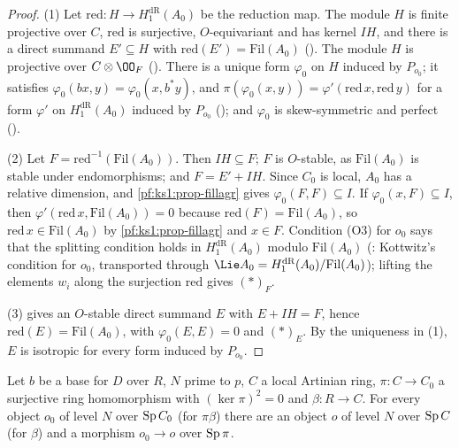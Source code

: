 \begin{proof}
(1) Let $\mathrm{red}:H\to H^{\mathrm{dR}}_1(A_0)$ be the reduction map. The module $H$ is finite projective over $C$, $\mathrm{red}$ is surjective,
$O$-equivariant and has kernel $IH$, and there is a direct summand $E'\subseteq H$ with $\mathrm{red}(E')=\mathrm{Fil}(A_0)$
(). The module $H$ is projective over $C\otimes\OO_F$
(). There is a unique form $\varphi_0$ on $H$ induced by $P_{o_0}$; it
satisfies $\varphi_0(bx,y)=\varphi_0(x,b^*y)$, and $\pi(\varphi_0(x,y))=\varphi'(\mathrm{red}\,x,\mathrm{red}\,y)$ for a form $\varphi'$ on
$H^{\mathrm{dR}}_1(A_0)$ induced by $P_{o_0}$ (); and $\varphi_0$ is skew-symmetric and perfect
().

(2) Let $F=\mathrm{red}^{-1}(\mathrm{Fil}(A_0))$. Then $IH\subseteq F$; $F$ is $O$-stable, as $\mathrm{Fil}(A_0)$ is stable under endomorphisms; and
$F=E'+IH$. Since $C_0$ is local, $A_0$ has a relative dimension, and \cref{pf:ks1:prop-fillagr} gives $\varphi_0(F,F)\subseteq I$. If
$\varphi_0(x,F)\subseteq I$, then $\varphi'(\mathrm{red}\,x,\mathrm{Fil}(A_0))=0$ because $\mathrm{red}(F)=\mathrm{Fil}(A_0)$, so
$\mathrm{red}\,x\in\mathrm{Fil}(A_0)$ by \cref{pf:ks1:prop-fillagr} and $x\in F$. Condition (O3) for $o_0$ says that the
splitting condition holds in $H^{\mathrm{dR}}_1(A_0)$ modulo $\mathrm{Fil}(A_0)$ (: Kottwitz's condition
for $o_0$, transported through $\Lie A_0=H^{\mathrm{dR}}_1(A_0)/\mathrm{Fil}(A_0)$); lifting the elements $w_i$ along the surjection $\mathrm{red}$ gives
$(*)_F$.

(3)  gives an $O$-stable direct summand $E$ with $E+IH=F$, hence $\mathrm{red}(E)=\mathrm{Fil}(A_0)$, with
$\varphi_0(E,E)=0$ and $(*)_E$. By the uniqueness in (1), $E$ is isotropic for every form induced by $P_{o_0}$.
\end{proof}

\begin{theorem}\label{pf:ks1:thm-sqzero}
Let $b$ be a base for $D$ over $R$, $N$ prime to $p$, $C$ a local Artinian ring, $\pi:C\to C_0$ a surjective ring homomorphism with $(\ker\pi)^2=0$
and $\beta:R\to C$. For every object $o_0$ of level $N$ over $\operatorname{Sp} C_0$ (for $\pi\beta$) there are an object $o$ of level $N$ over $\operatorname{Sp} C$
(for $\beta$) and a morphism $o_0\to o$ over $\operatorname{Sp}\pi$.
\end{theorem}

